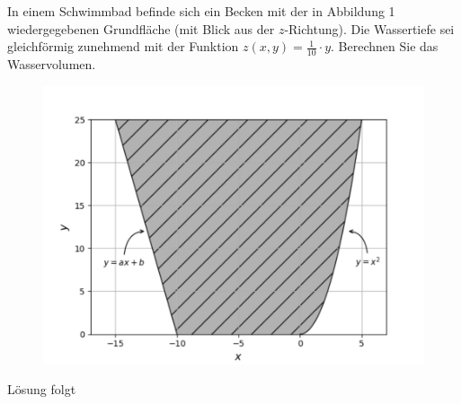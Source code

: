 \documentclass{atistandalonetask}
\begin{document}
	  \begin{atiTask}[
  title = Volumen eines Schwimmbeckens
	]
In einem Schwimmbad befinde sich ein Becken mit der in Abbildung 1 wiedergegebenen Grundfläche (mit Blick aus der $z$-Richtung). Die Wassertiefe sei gleichförmig zunehmend mit der Funktion $z(x,y)=\frac{1}{10}\cdot y$. Berechnen Sie das Wasservolumen.\\[-0.7cm]
\begin{figure}[h]
\centering
\includegraphics[width=0.7\linewidth]{./picture-dreifachintegral}
\label{fig:picture-dreifachintegral}
\end{figure}


\end{atiTask}

 \begin{atiSolution}
   	Lösung folgt
  \end{atiSolution}
\end{document}
